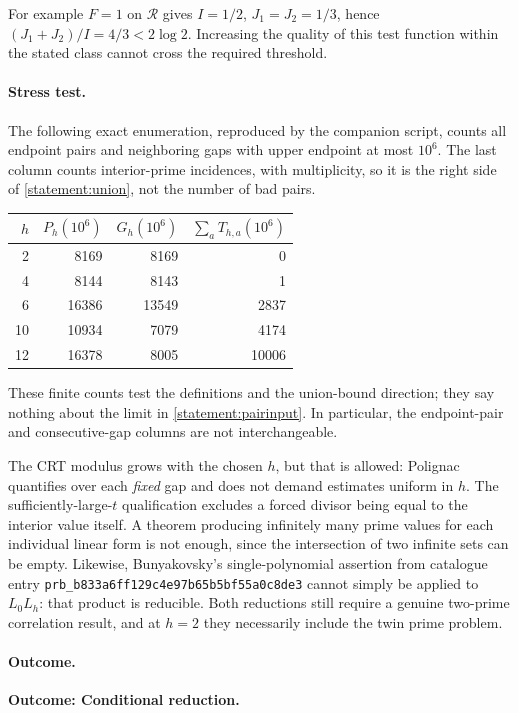\documentclass[11pt,a4paper]{article}
\numberwithin{equation}{section}
\begin{document}
For example $F=1$ on $\mathcal R$ gives $I=1/2$, $J_1=J_2=1/3$, hence
$(J_1+J_2)/I=4/3<2\log2$. Increasing the quality of this test function within
the stated class cannot cross the required threshold.

\paragraph{Stress test.}
The following exact enumeration, reproduced by the companion script, counts
all endpoint pairs and neighboring gaps with upper endpoint at most
$10^6$. The last column counts interior-prime incidences, with multiplicity,
so it is the right side of \eqref{statement:union}, not the number of bad pairs.
\begin{center}
\begin{tabular}{r|r|r|r}
$h$ & $P_h(10^6)$ & $G_h(10^6)$ & $\sum_a T_{h,a}(10^6)$\\\hline
2 & 8169 & 8169 & 0\\
4 & 8144 & 8143 & 1\\
6 & 16386 & 13549 & 2837\\
10 & 10934 & 7079 & 4174\\
12 & 16378 & 8005 & 10006
\end{tabular}
\end{center}
These finite counts test the definitions and the union-bound direction;
they say nothing about the limit in \eqref{statement:pairinput}. In particular,
the endpoint-pair and consecutive-gap columns are not interchangeable.

The CRT modulus grows with the chosen $h$, but that is allowed: Polignac
quantifies over each \emph{fixed} gap and does not demand estimates uniform
in $h$. The sufficiently-large-$t$ qualification excludes a forced divisor
being equal to the interior value itself. A theorem producing infinitely
many prime values for each individual linear form is not enough, since the
intersection of two infinite sets can be empty. Likewise, Bunyakovsky's
single-polynomial assertion from catalogue entry \texttt{prb\_b833a6ff129c4e97b65b5bf55a0c8de3} cannot simply be applied to
$L_0L_h$: that product is reducible. Both reductions still require a genuine
two-prime correlation result, and at $h=2$ they necessarily include the twin
prime problem.

\paragraph{Outcome.}
\textbf{Outcome: Conditional reduction.}
\end{document}
